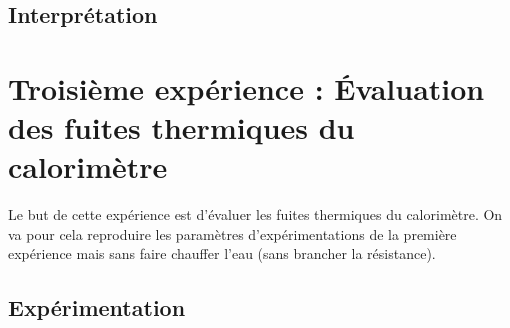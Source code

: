 \documentclass[12pt]{article}
\begin{document}
\subsection{Interprétation}



\section{Troisième expérience : Évaluation des fuites thermiques du calorimètre}
Le but de cette expérience est d'évaluer les fuites thermiques du calorimètre. On va pour cela reproduire les paramètres d'expérimentations de la première expérience mais sans faire chauffer l'eau (sans brancher la résistance).
\subsection{Expérimentation}
\end{document}
